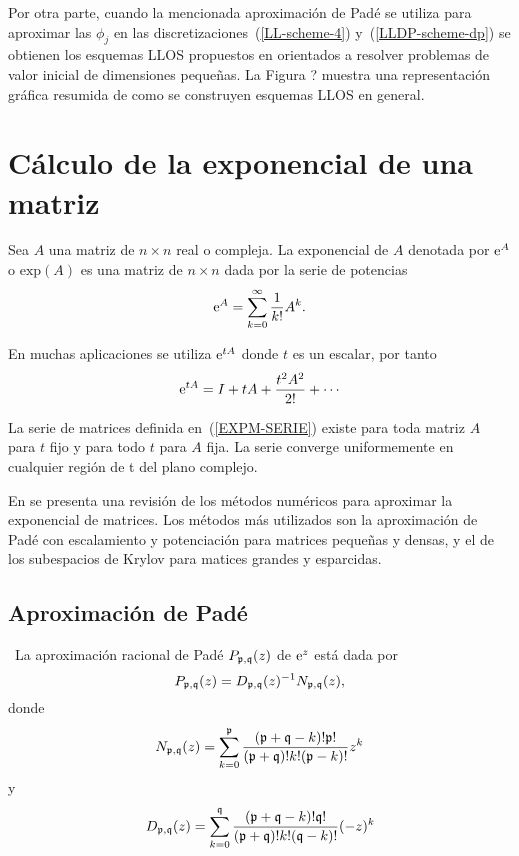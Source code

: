 Por otra parte, cuando la mencionada aproximación de Padé se utiliza para aproximar las $\phi_j$ en las discretizaciones~(\ref{LL-scheme-4}) y~(\ref{LLDP-scheme-dp}) se obtienen los esquemas LLOS propuestos en \cite{Jimenez13,Jimenez14AMC} orientados a resolver problemas de valor inicial de dimensiones pequeñas. La Figura ? muestra una representación gráfica resumida de como se construyen esquemas LLOS en general. 

\section{Cálculo de la exponencial de una matriz}

\begin{definition}
    \label{EXPM}\cite{golub2013matrix} Sea $A$ una matriz de $n\times n$ real o compleja. La exponencial de $A$ denotada por
    $ \mathrm{e}^{A} $ o $\mathrm{exp}(A)$ es una matriz de $n\times n$ dada por la serie de potencias
    \[\mathrm{e}^{A}=\sum_{k=0}^{\infty}\frac{1}{k!}A^{k}.\]
\end{definition}
En muchas aplicaciones se utiliza $\mathrm{e}^{tA}$ donde $t$ es un escalar, por tanto 
\begin{equation}
\me{tA}=I+tA+\frac{t^{2}A^{2}}{2!}+\cdots\label{EXPM-SERIE}
\end{equation}
\begin{theorem}\cite{IntroMatrix}
    La serie de matrices definida en~(\ref{EXPM-SERIE}) existe para toda matriz $A$ para $t$ fijo y
    para todo $t$ para $A$ fija. La serie converge uniformemente en cualquier región de t del plano complejo.
\end{theorem}

En \cite{golub2013matrix} se presenta una revisión de los métodos numéricos
para aproximar
la exponencial de matrices. Los métodos más utilizados son la aproximación de Padé con escalamiento
y potenciación para matrices pequeñas y densas, y el de los subespacios de Krylov para matices grandes y esparcidas.


\subsection{Aproximación de Padé}\label{section:pade-approx}

\begin{definition}
    \cite{golub2013matrix}~La aproximación racional de Padé $P_{\mathfrak{p},\mathfrak{q}}(z)$
    de $\mathrm{e}^{z}$ está dada por 
    \begin{equation*}
    P_{\mathfrak{p},\mathfrak{q}}(z)=D_{\mathfrak{p},\mathfrak{q}}(z)^{-1}N_{\mathfrak{p},\mathfrak{q}}(z),  \label{FORM PADE}
    \end{equation*}%
    donde 
    \[
    N_{\mathfrak{p},\mathfrak{q}}(z)=\sum\limits_{k=0}^{\mathfrak{p}}\frac{(\mathfrak{p}+\mathfrak{q}-k)!\mathfrak{p}!}{(\mathfrak{p}+\mathfrak{q})!k!(\mathfrak{p}-k)!}z^k
    \]%
    y 
    \[
    D_{\mathfrak{p},\mathfrak{q}}(z)=\sum\limits_{k=0}^{\mathfrak{q}}\frac{(\mathfrak{p}+\mathfrak{q}-k)!\mathfrak{q}!}{(\mathfrak{p}+\mathfrak{q})!k!(\mathfrak{q}-k)!}(-z)^k
    \]
\end{definition}

